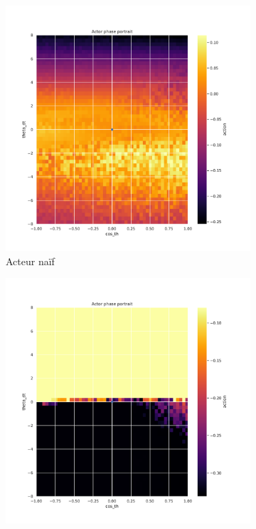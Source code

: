 \begin{figure}[H]
    \centering
    \begin{subfigure}{0.3\textwidth}
        \includegraphics[width=\textwidth]{figures/iteration3/0_actor_discount__ante_Pendulum-v0.pdf}
        \caption{Acteur naïf}
    \end{subfigure}
    \begin{subfigure}{0.3\textwidth}
        \includegraphics[width=\textwidth]{figures/iteration3/0_actor_discount__post_Pendulum-v0.pdf}

\end{subfigure}
\end{figure}
